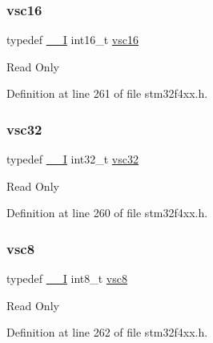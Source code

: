 \subsubsection{\texorpdfstring{vsc16}{vsc16}}
{\footnotesize\ttfamily typedef \hyperlink{group___c_m_s_i_s__core__definitions_gaf63697ed9952cc71e1225efe205f6cd3}{\+\_\+\+\_\+I} int16\+\_\+t \hyperlink{group___exported__types_ga369ae0177b957e5afa7c1e62312f97c3}{vsc16}}

Read Only 

Definition at line 261 of file stm32f4xx.\+h.

\mbox{\label{group___exported__types_gaec1d22666cf030b79051e5daa372fbc8}} 
\subsubsection{\texorpdfstring{vsc32}{vsc32}}
{\footnotesize\ttfamily typedef \hyperlink{group___c_m_s_i_s__core__definitions_gaf63697ed9952cc71e1225efe205f6cd3}{\+\_\+\+\_\+I} int32\+\_\+t \hyperlink{group___exported__types_gaec1d22666cf030b79051e5daa372fbc8}{vsc32}}

Read Only 

Definition at line 260 of file stm32f4xx.\+h.

\mbox{\label{group___exported__types_ga47463bcded079ac61d5da46aff497803}} 
\subsubsection{\texorpdfstring{vsc8}{vsc8}}
{\footnotesize\ttfamily typedef \hyperlink{group___c_m_s_i_s__core__definitions_gaf63697ed9952cc71e1225efe205f6cd3}{\+\_\+\+\_\+I} int8\+\_\+t \hyperlink{group___exported__types_ga47463bcded079ac61d5da46aff497803}{vsc8}}

Read Only 

Definition at line 262 of file stm32f4xx.\+h.

\mbox{\label{group___exported__types_ga7f6037565f0caa27727c8b871daf0d56}} 
